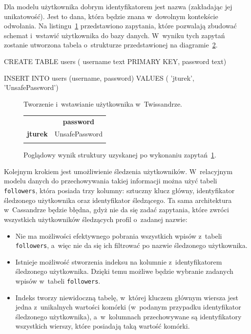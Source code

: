 Dla modelu użytkownika dobrym identyfikatorem jest nazwa (zakładając jej unikatowość). Jest to dana, która będzie znana w~dowolnym kontekście odwołania. Na listingu~\ref{lst:creating_inserting_users} przedstawiono zapytania, które pozwalają zbudować schemat i~wstawić użytkownika do bazy danych. W~wyniku tych zapytań zostanie utworzona tabela o~strukturze przedstawionej na diagramie~\ref{tab:creating_inserting_users_structure}. 

\begin{verbbox}
CREATE TABLE users (
    username text PRIMARY KEY,
    password text)

INSERT INTO users (username, password) VALUES (
    'jturek',
    'UnsafePassword')
\end{verbbox}

\begin{figure}[ht!]
	\centering
	\theverbbox
	\caption{Tworzenie i~wstawianie użytkownika w~Twissandrze.}
	\label{lst:creating_inserting_users}
\end{figure}

\begin{figure}[ht!]
	\centering
	\begin{tabular}{|l||c|}
		\hhline{|-||-|}
		& \textbf{password} \\
		\hhline{|~||=|}
		\textbf{jturek} & UnsafePassword \\
		\hhline{|-||-|}
	\end{tabular} 

	\caption{Poglądowy wynik struktury uzyskanej po wykonaniu zapytań~\ref{lst:creating_inserting_users}.}
	\label{tab:creating_inserting_users_structure}
\end{figure}

Kolejnym krokiem jest umożliwienie śledzenia użytkowników. W~relacyjnym modelu danych do przechowywania takiej informacji można użyć tabeli \verb+followers+, która posiada trzy kolumny: sztuczny klucz główny, identyfikator śledzonego użytkownika oraz identyfikator śledzącego. Ta sama architektura w~Cassandrze będzie błędna, gdyż nie da się zadać zapytania, które zwróci wszystkich użytkowników śledzących profil o~zadanej nazwie:

\begin{itemize}
	\item Nie ma możliwości efektywnego pobrania wszystkich wpisów z~tabeli \verb+followers+, a~więc nie da się ich filtrować po nazwie śledzonego użytkownika.
	\item Istnieje możliwość stworzenia indeksu na kolumnie z~identyfikatorem śledzonego użytkownika. Dzięki temu możliwe będzie wybranie zadanych wpisów w~tabeli \verb+followers+.
	\item Indeks tworzy niewidoczną tabelę, w~której kluczem głównym wiersza jest jedna z~unikalnych wartości komórki (w~podanym przypadku identyfikator śledzonego użytkownika), a~w~kolumnach przechowywane są identyfikatory wszystkich wierszy, które posiadają taką wartość komórki.
\end{itemize}

